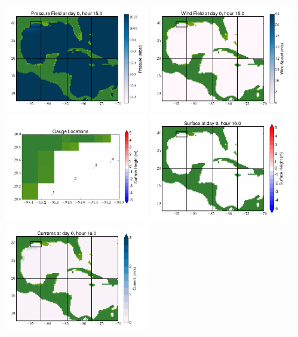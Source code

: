 \documentclass[11pt]{article}
\begin{document}
\includegraphics[width=0.475\textwidth]{frame0087fig8.png}
\vskip 10pt 
\includegraphics[width=0.475\textwidth]{frame0087fig9.png}
\includegraphics[width=0.475\textwidth]{frame0087fig10.png}
\vskip 10pt 
\includegraphics[width=0.475\textwidth]{frame0088fig1.png}
\includegraphics[width=0.475\textwidth]{frame0088fig2.png}
\end{document}
